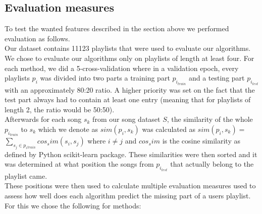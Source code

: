 \subsection{Evaluation measures}
To test the wanted features described in the section above we performed evaluation as follows. \\
Our dataset contains 11123 playlists that were used to evaluate our algorithms. We chose to evaluate our algorithms only on playlists of length at least four. For each method, we did a 5-cross-validation where in a validation epoch, every playlists $p_i$ was divided into two parts a training part $p_{i_{train}}$ and a testing part $p_{i_{test}}$ with an approximately 80:20 ratio. A higher priority was set on the fact that the test part always had to contain at least one entry (meaning that for playlists of length 2, the ratio would be 50:50). \\
Afterwards for each song $ s_k $ from our song dataset $S$, the similarity of the whole $p_{i_{train}}$ to $s_k$ which we denote as $ sim(p_i, s_k) $ was calculated as $sim(p_i, s_k) =$ $\sum_{s_j\in{p_i{_{train}}}} cos_sim(s_i, s_j) $ where $ i \neq j$ and $cos_sim$ is the cosine similarity as defined by Python scikit-learn package. These similarities were then sorted and it was determined at what position the songs from $p_{i_{test}} $ that actually belong to the playlist came. \\
These positions were then used to calculate multiple evaluation measures used to assess how well does each algorithm predict the missing part of a users playlist. For this we chose the following for methods:
